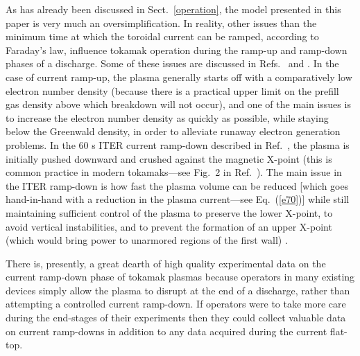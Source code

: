 \documentclass{iopjournal}
\begin{document}
As has already been discussed in Sect.~\ref{operation}, the model presented in this paper is very much an oversimplification. In reality, other issues than the minimum time at which
the toroidal current can be ramped, according to Faraday's law, influence  tokamak operation during the ramp-up and ramp-down phases of a discharge. 
Some of these issues are discussed in Refs.~\cite{mul} and \cite{kok}. 
In the case of current ramp-up, the plasma generally starts off with a comparatively low electron number density (because there is a practical upper limit
on the prefill gas density above which breakdown will not occur), and one of the main issues is to increase the electron number density as
quickly as possible, while staying below the Greenwald density,  in order to alleviate runaway electron generation problems.   In the 60 s ITER current ramp-down described in Ref.~\cite{deVries}, the plasma
is initially pushed downward and crushed against the magnetic X-point (this is common practice in modern tokamaks---see Fig.~2 in Ref.~\cite{mul}). The main issue
in the ITER ramp-down is how fast the plasma volume can be reduced [which goes hand-in-hand with a reduction in the plasma current---see Eq.~(\ref{e70})]
while still maintaining sufficient control of the plasma to preserve the lower X-point, to avoid vertical instabilities, and to prevent the formation of an
upper X-point (which would bring power to unarmored regions of the first wall) \cite{deVries1}.

There is, presently, a great dearth of high quality experimental data on the current ramp-down phase of tokamak plasmas because operators in many existing devices simply
allow the plasma to disrupt at the end of a discharge, rather than attempting a controlled current ramp-down. If operators were to take more care during the end-stages
of their experiments then they could collect valuable data on current ramp-downs in addition to any data acquired during the current flat-top.


\end{document}
